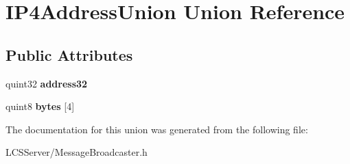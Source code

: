 \hypertarget{union_i_p4_address_union}{}\section{I\+P4\+Address\+Union Union Reference}
\label{union_i_p4_address_union}
\subsection*{Public Attributes}
\begin{DoxyCompactItemize}
\item 
\mbox{\label{union_i_p4_address_union_abdbfed2541371505a7ea534a37f35cbe}} 
quint32 {\bfseries address32}
\item 
\mbox{\label{union_i_p4_address_union_a97933d1b68d57bd37370816cb2f194ee}} 
quint8 {\bfseries bytes} \mbox{[}4\mbox{]}
\end{DoxyCompactItemize}


The documentation for this union was generated from the following file\+:\begin{DoxyCompactItemize}
\item 
L\+C\+S\+Server/Message\+Broadcaster.\+h\end{DoxyCompactItemize}
